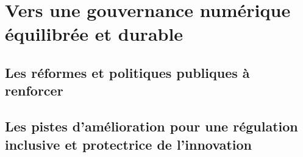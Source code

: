 
\chapter{Vers une gouvernance numérique équilibrée et durable}

\section{Les réformes et politiques publiques à renforcer}


\section{Les pistes d’amélioration pour une régulation inclusive et protectrice de l’innovation}

